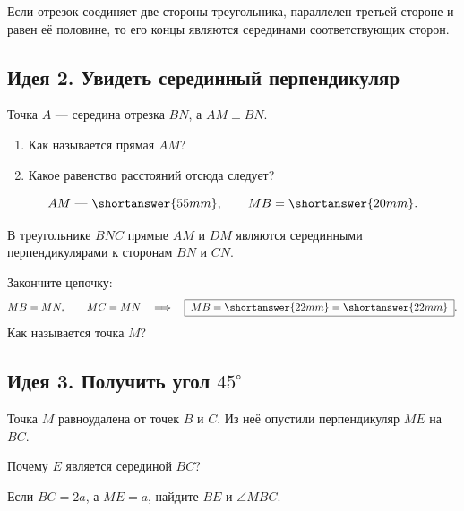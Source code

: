 \begin{propertybox}
Если отрезок соединяет две стороны треугольника, параллелен третьей стороне
и равен её половине, то его концы являются серединами соответствующих сторон.
\end{propertybox}

\subsection{Идея 2. Увидеть серединный перпендикуляр}

\begin{trainingtask}
Точка \(A\) — середина отрезка \(BN\), а \(AM\perp BN\).

\perpendicularbisectorfigure

\begin{enumerate}
  \item Как называется прямая \(AM\)?
  \item Какое равенство расстояний отсюда следует?
\end{enumerate}

\[
AM\text{ — }\shortanswer{55mm},
\qquad
MB=\shortanswer{20mm}.
\]
\end{trainingtask}
\begin{trainingtask}
В треугольнике \(BNC\) прямые \(AM\) и \(DM\) являются серединными
перпендикулярами к сторонам \(BN\) и \(CN\).

\circumcenterfigure

Закончите цепочку:
\[
MB=MN,
\qquad
MC=MN
\quad\Longrightarrow\quad
\boxed{\;MB=\shortanswer{22mm}=\shortanswer{22mm}\;}.
\]
Как называется точка \(M\)? \shortanswer{70mm}
\end{trainingtask}

\newpage
\subsection{Идея 3. Получить угол \(45^\circ\)}

\begin{trainingtask}
Точка \(M\) равноудалена от точек \(B\) и \(C\). Из неё опустили
перпендикуляр \(ME\) на \(BC\).

\perpendicularmefigure

Почему \(E\) является серединой \(BC\)?
\answerline[2]

Если \(BC=2a\), а \(ME=a\), найдите \(BE\) и \(\angle MBC\).
\answerline[3]
\end{trainingtask}

